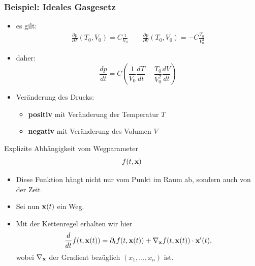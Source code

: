
\begin{frame}
  \frametitle<presentation>{Beispiel: Ideales Gasgesetz}
  
  \begin{itemize}
  \item es gilt:
    \begin{gather*}
      \frac{\partial p}{\partial T}(T_0,V_0) = C\frac{1}{V_0}
      \qquad\frac{\partial p}{\partial V}(T_0,V_0) = -C\frac{T_0}{V_0^2}      
    \end{gather*}
        \item daher:
        \begin{equation}
          \frac{dp}{dt}
          = C\left( \frac{1}{V_0} \frac{dT}{dt}
            -\frac{T_0}{V_0^2} \frac{dV}{dt}\right)
        \end{equation}
      \item Veränderung des Drucks:
        \begin{itemize}
        \item  {\bf positiv} mit Veränderung der
          Temperatur $T$
          \item {\bf negativ} mit Veränderung des Volumen $V$
        \end{itemize}
    \end{itemize}
\end{frame}



\begin{frame}{Explizite Abhängigkeit vom Wegparameter}
  \begin{gather*}
    f(t,\mathbf{x})
  \end{gather*}
  \begin{itemize}
  \item Diese Funktion hängt nicht nur vom Punkt im Raum ab, sondern
    auch von der \glqq{}Zeit\grqq
  \item Sei nun $\mathbf{x}(t)$ ein Weg.
    \pause
  \item Mit der Kettenregel erhalten wir hier
    \begin{gather*}
      \frac{d}{dt}f(t,\mathbf{x}(t)) = \partial_t f(t,\mathbf{x}(t))
      + \nabla_{\mathbf{x}} f(t,\mathbf{x}(t)) \cdot \mathbf{x}'(t),
    \end{gather*}
    wobei $\nabla_{\mathbf{x}}$ der Gradient bezüglich $(x_1,\dots,x_n)$ ist.
  \end{itemize}
\end{frame}

